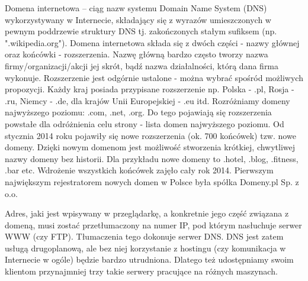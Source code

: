 \documentclass[a4paper,twoside,12pt]{mgr}
\begin{document}
Domena internetowa – ciąg nazw systemu Domain Name System (DNS) wykorzystywany w Internecie, składający się z wyrazów umieszczonych w pewnym poddrzewie struktury DNS tj. zakończonych stałym sufiksem (np. ".wikipedia.org").
Domena internetowa składa się z dwóch części - nazwy głównej oraz końcówki - rozszerzenia. Nazwę główną bardzo często tworzy nazwa firmy/organizacji/akcji jej skrót, bądź nazwa działalności, którą dana firma wykonuje. Rozszerzenie jest odgórnie ustalone - można wybrać spośród możliwych propozycji. Każdy kraj posiada przypisane rozszerzenie np. Polska - .pl, Rosja - .ru, Niemcy - .de, dla krajów Unii Europejskiej - .eu itd. Rozróżniamy domeny najwyższego poziomu: .com, .net, .org. Do tego pojawiają się rozszerzenia powstałe dla odróżnienia celu strony - lista domen najwyższego poziomu.
Od stycznia 2014 roku pojawiły się nowe rozszerzenia (ok. 700 końcówek) tzw. nowe domeny. Dzięki nowym domenom jest możliwość stworzenia krótkiej, chwytliwej nazwy domeny bez historii. Dla przykładu nowe domeny to .hotel, .blog, .fitness, .bar etc. Wdrożenie wszystkich końcówek zajęło cały rok 2014. Pierwszym największym rejestratorem nowych domen w Polsce była spółka Domeny.pl Sp. z o.o.

Adres, jaki jest wpisywany w przeglądarkę, a konkretnie jego część związana z domeną, musi zostać przetłumaczony na numer IP, pod którym nasłuchuje serwer WWW (czy FTP). Tłumaczenia tego dokonuje serwer DNS.
DNS jest zatem usługą drugoplanową, ale bez niej korzystanie z hostingu (czy komunikacja w Internecie w ogóle) będzie bardzo utrudniona. Dlatego też udostępniamy swoim klientom przynajmniej trzy takie serwery pracujące na różnych maszynach. 
\end{document}
